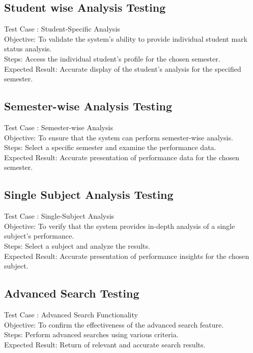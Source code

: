 \documentclass{nascproject}
\begin{document}
\subsection{ Student wise Analysis Testing}
Test Case : Student-Specific Analysis\\
Objective: To validate the system's ability to provide individual student mark status analysis.\\
Steps: Access the individual student's profile for the chosen semester.\\
Expected Result: Accurate display of the student's analysis for the specified semester.\\
\subsection{Semester-wise Analysis Testing}
Test Case : Semester-wise Analysis\\
Objective: To ensure that the system can perform semester-wise analysis.\\
Steps: Select a specific semester and examine the performance data.\\
Expected Result: Accurate presentation of performance data for the chosen semester.
\subsection{Single Subject Analysis Testing}
Test Case : Single-Subject Analysis\\
Objective: To verify that the system provides in-depth analysis of a single subject's performance.\\
Steps: Select a subject and analyze the results.\\
Expected Result: Accurate presentation of performance insights for the chosen subject.
\subsection{ Advanced Search Testing}
Test Case : Advanced Search Functionality\\
Objective: To confirm the effectiveness of the advanced search feature.\\
Steps: Perform advanced searches using various criteria.\\
Expected Result: Return of relevant and accurate search results.\\
\end{document}
